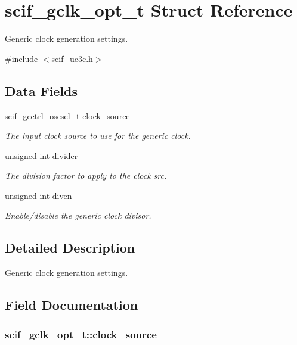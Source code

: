 \hypertarget{structscif__gclk__opt__t}{
\section{scif\-\_\-gclk\-\_\-opt\-\_\-t \-Struct \-Reference}
\label{structscif__gclk__opt__t}
}


\-Generic clock generation settings.  




{\ttfamily \#include $<$scif\-\_\-uc3c.\-h$>$}

\subsection*{\-Data \-Fields}
\begin{DoxyCompactItemize}
\item 
\hyperlink{scif__uc3c_8h_a2a2e11f06784f5133dd912e595fde6f0}{scif\-\_\-gcctrl\-\_\-oscsel\-\_\-t} \hyperlink{structscif__gclk__opt__t_a7f093e4c255de54d9ab438356372fdf1}{clock\-\_\-source}
\begin{DoxyCompactList}\small\item\em \-The input clock source to use for the generic clock. \end{DoxyCompactList}\item 
unsigned int \hyperlink{structscif__gclk__opt__t_ab737b01b420ea1a5df2fb2de4efe6b3e}{divider}
\begin{DoxyCompactList}\small\item\em \-The division factor to apply to the clock src. \end{DoxyCompactList}\item 
unsigned int \hyperlink{structscif__gclk__opt__t_a9f55e1a053f9b01014ba215e52e1f2d8}{diven}
\begin{DoxyCompactList}\small\item\em \-Enable/disable the generic clock divisor. \end{DoxyCompactList}\end{DoxyCompactItemize}


\subsection{\-Detailed \-Description}
\-Generic clock generation settings. 

\subsection{\-Field \-Documentation}
\hypertarget{structscif__gclk__opt__t_a7f093e4c255de54d9ab438356372fdf1}{
\subsubsection[{clock\-\_\-source}]{ {\bf scif\-\_\-gclk\-\_\-opt\-\_\-t\-::clock\-\_\-source}}}
\label{structscif__gclk__opt__t_a7f093e4c255de54d9ab438356372fdf1}


